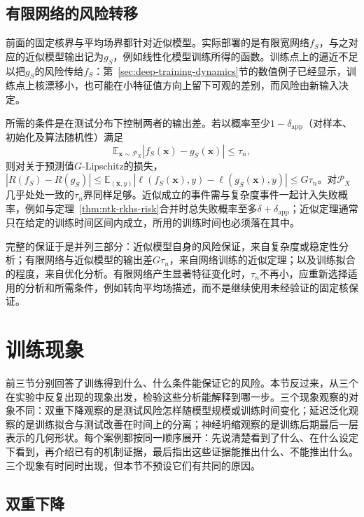 \subsection{有限网络的风险转移}
\label{sec:network-risk-transfer}

前面的固定核界与平均场界都针对近似模型。实际部署的是有限宽网络$f_S$，与之对应的近似模型输出记为$g_S$，例如线性化模型训练所得的函数。训练点上的逼近不足以把$g_S$的风险传给$f_S$：第~\ref{sec:deep-training-dynamics}节的数值例子已经显示，训练点上核漂移小，也可能在小特征值方向上留下可观的差别，而风险由新输入决定。

所需的条件是在测试分布下控制两者的输出差。若以概率至少$1-\delta_{\mathrm{app}}$（对样本、初始化及算法随机性）满足
\[
 \mathbb E_{\bm x\sim\mathcal P_X}|f_S(\bm x)-g_S(\bm x)|\leq\tau_n,
\]
则对关于预测值$G$-Lipschitz的损失，$|R(f_S)-R(g_S)|\leq\mathbb E_{(\bm x,y)}|\ell(f_S(\bm x),y)-\ell(g_S(\bm x),y)|\leq G\tau_n$。对$\mathcal P_X$几乎处处一致的$\tau_n$界同样足够。近似成立的事件需与复杂度事件一起计入失败概率，例如与定理~\ref{thm:ntk-rkhs-risk}合并时总失败概率至多$\delta+\delta_{\mathrm{app}}$；近似定理通常只在给定的训练时间区间内成立，所用的训练时间也必须落在其中。

完整的保证于是并列三部分：近似模型自身的风险保证，来自复杂度或稳定性分析；有限网络与近似模型的输出差$G\tau_n$，来自网络训练的近似定理；以及训练拟合的程度，来自优化分析。有限网络产生显著特征变化时，$\tau_n$不再小，应重新选择适用的分析和所需条件，例如转向平均场描述，而不是继续使用未经验证的固定核保证。

\section{训练现象}
\label{sec:training-phenomena}

前三节分别回答了训练得到什么、什么条件能保证它的风险。本节反过来，从三个在实验中反复出现的现象出发，检验这些分析能解释到哪一步。三个现象观察的对象不同：双重下降观察的是测试风险怎样随模型规模或训练时间变化；延迟泛化观察的是训练拟合与测试改善在时间上的分离；神经坍缩观察的是训练后期最后一层表示的几何形状。每个案例都按同一顺序展开：先说清楚看到了什么、在什么设定下看到，再介绍已有的机制证据，最后指出这些证据能推出什么、不能推出什么。三个现象有时同时出现，但本节不预设它们有共同的原因。

\subsection{双重下降}
\label{sec:double-descent}

